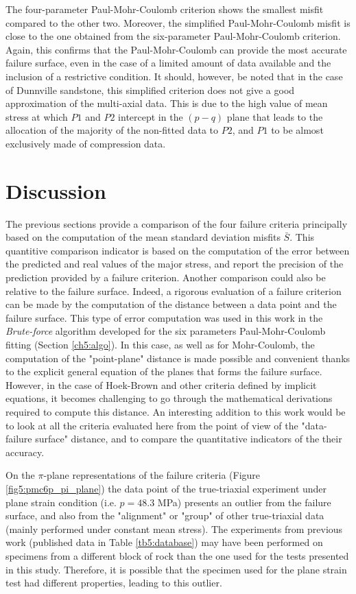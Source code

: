 The four-parameter Paul-Mohr-Coulomb criterion shows the smallest misfit compared to the other two. Moreover, the simplified Paul-Mohr-Coulomb misfit is close to the one obtained from the six-parameter Paul-Mohr-Coulomb criterion. Again, this confirms that the Paul-Mohr-Coulomb can provide the most accurate failure surface, even in the case of a limited amount of data available and the inclusion of a restrictive condition. It should, however, be noted that in the case of Dunnville sandstone, this simplified criterion does not give a good approximation of the multi-axial data. This is due to the high value of mean stress at which $P1$ and $P2$ intercept in the $(p-q)$ plane that leads to the allocation of the majority of the non-fitted data to $P2$, and $P1$ to be almost exclusively made of compression data. 

\section{Discussion}

The previous sections provide a comparison of the four failure criteria principally based on the computation of the mean standard deviation misfits $\bar{S}$. This quantitive comparison indicator is based on the computation of the error between the predicted and real values of the major stress, and report the precision of the prediction provided by a failure criterion. Another comparison could also be relative to the failure surface. Indeed, a rigorous evaluation  of a failure criterion can be made by the computation of the distance between a data point and the failure surface. This type of error computation was used in this work in the \emph{Brute-force} algorithm developed for the six parameters Paul-Mohr-Coulomb fitting (Section \ref{ch5:algo}). In this case, as well as for Mohr-Coulomb, the computation of the "point-plane" distance is made possible and convenient thanks to the explicit general equation of the planes that forms the failure surface. However, in the case of Hoek-Brown and other criteria defined by implicit equations, it becomes challenging to go through the mathematical derivations required to compute this distance. An interesting addition to this work would be to look at all the criteria evaluated here from the point of view of the "data-failure surface" distance, and to compare the quantitative indicators of the their accuracy.

On the $\pi$-plane representations of the failure criteria (Figure \ref{fig5:pmc6p_pi_plane}) the data point of the true-triaxial experiment under plane strain condition (i.e. $p = 48.3$ \si{MPa}) presents an outlier from the failure surface, and also from the "alignment" or "group" of other true-triaxial data (mainly performed under constant mean stress). The experiments from previous work (published data in Table \ref{tb5:database}) may have been performed on specimens from a different block of rock than the one used for the tests presented in this study. Therefore, it is possible that the specimen used for the plane strain test had different properties, leading to this outlier. 

